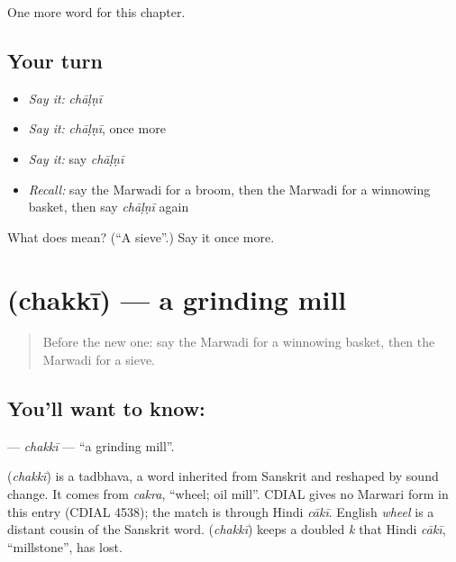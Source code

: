 \begin{grammarlens}[title={What you've built}]
One more word for this chapter.
\end{grammarlens}

\subsection*{Your turn}
\begin{itemize}
\raggedright
  \item \emph{Say it:} \emph{chāḷṇī}
  \item \emph{Say it:} \emph{chāḷṇī}, once more
  \item \emph{Say it:} say \emph{chāḷṇī}
  \item \emph{Recall:} say the Marwadi for a broom, then the Marwadi for a winnowing basket, then say \emph{chāḷṇī} again
\end{itemize}

\begin{tcolorbox}[breakable,colback=teal!4,colframe=teal!35!black,title={Before you move on}]
What does  mean? (\textquotedblleft{}A sieve\textquotedblright{}.) Say it once more.
\end{tcolorbox}
\section[\texorpdfstring{\mw{चक्की} (chakkī)}{चक्की (chakkī)}]{ (chakkī) — a grinding mill}

\label{lesson:MW-C120-chakki}



\begin{quote}
Before the new one: say the Marwadi for a winnowing basket, then the Marwadi for a sieve.
\end{quote}

\subsection*{You'll want to know: }
\textbf{} — \emph{chakkī} — \textquotedblleft{}a grinding mill\textquotedblright{}.

\begin{cousinweb}
\textbf{} (\emph{chakkī}) is a tadbhava, a word inherited from Sanskrit and reshaped by sound change. It comes from \emph{cakra}, \textquotedblleft{}wheel; oil mill\textquotedblright{}. CDIAL gives no Marwari form in this entry (CDIAL 4538); the match is through Hindi \emph{cākī}. English \emph{wheel} is a distant cousin of the Sanskrit word. \textbf{} (\emph{chakkī}) keeps a doubled \emph{k} that Hindi \emph{cākī}, \textquotedblleft{}millstone\textquotedblright{}, has lost.
\end{cousinweb}

